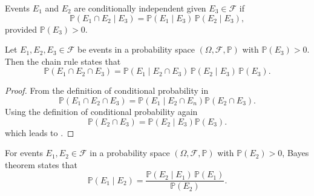 \begin{definition}
	\label{def:conditional_independence}
	Events $E_1$ and $E_2$ are conditionally independent given $E_3 \in \mathcal{F}$ if
	\begin{equation}
		\mathbb{P}(E_1 \cap E_2 \mid E_3) = \mathbb{P}(E_1 \mid E_3)\,\mathbb{P}(E_2 \mid E_3),
	\end{equation}
	provided $\mathbb{P}(E_3) > 0$.
\end{definition}

\begin{theorem}
	\label{theorem:chain_rule}
	Let $E_1, E_2, E_3 \in \mathcal{F}$ be events in a probability space $(\Omega, \mathcal{F}, \mathbb{P})$ with $\mathbb{P}(E_3) > 0$. Then the chain rule states that
	\begin{equation}
		\mathbb{P}(E_1 \cap E_2 \cap E_3) 
		= \mathbb{P}(E_1 \mid E_2 \cap E_3)\,\mathbb{P}(E_2 \mid E_3)\,\mathbb{P}(E_3).
	\end{equation}
\end{theorem}
\begin{proof}
	From the definition of conditional probability in 
	\begin{equation}
		\mathbb{P}(E_1 \cap E_2 \cap E_3) = \mathbb{P}(E_1\mid E_2 \cap E_n)\mathbb{P}(E_2 \cap E_3).
		\label{eq:p1}
	\end{equation}
	Using the definition of conditional probability again
	\begin{equation}
		\mathbb{P}(E_2 \cap E_3) = \mathbb{P}(E_2\mid  E_3)\mathbb{P}(E_3).
	\end{equation}
	which leads to .
\end{proof}

\begin{theorem}
	\label{theorem:bayes_theorem}
	For events $E_1, E_2 \in \mathcal{F}$ in a probability space $(\Omega, \mathcal{F}, \mathbb{P})$ with $\mathbb{P}(E_2) > 0$, Bayes theorem states that
	\begin{equation}
		\mathbb{P}(E_1 \mid E_2) = \frac{\mathbb{P}(E_2 \mid E_1)\,\mathbb{P}(E_1)}{\mathbb{P}(E_2)}.
		\label{bayes_theorem}
	\end{equation}
\end{theorem}

